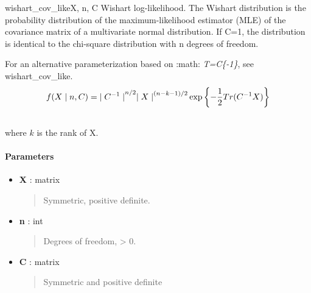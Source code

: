 \hypertarget{pymc.distributions.wishart_cov_like}{}\begin{funcdesc}{wishart\_cov\_like}{X, n, C}
Wishart log-likelihood. The Wishart distribution is the probability
distribution of the maximum-likelihood estimator (MLE) of the covariance
matrix of a multivariate normal distribution. If C=1, the distribution
is identical to the chi-square distribution with n degrees of freedom.

For an alternative parameterization based on :math: \emph{T=C\{-1\}}, see 
wishart\_cov\_like.
\begin{gather}
\begin{split}f(X \mid n, C) = {\mid C^{-1} \mid}^{n/2}{\mid X \mid}^{(n-k-1)/2} \exp\left\{ -\frac{1}{2} Tr(C^{-1}X) \right\}\end{split}\notag\\\begin{split}\end{split}\notag
\end{gather}
where $k$ is the rank of X.
\paragraph{Parameters}\begin{itemize}

\item[] \textbf{X} : matrix
\begin{quote}

Symmetric, positive definite.
\end{quote}

\item[] \textbf{n} : int
\begin{quote}

Degrees of freedom, \textgreater{} 0.
\end{quote}

\item[] \textbf{C} : matrix
\begin{quote}

Symmetric and positive definite
\end{quote}
\end{itemize}
\end{funcdesc}



